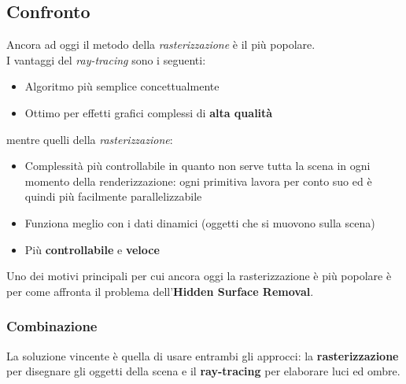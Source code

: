 \subsection{Confronto}
Ancora ad oggi il metodo della \textit{rasterizzazione} è il più popolare.\\
I vantaggi del \textit{ray-tracing} sono i seguenti:
\begin{itemize}
	\item Algoritmo più semplice concettualmente
	\item Ottimo per effetti grafici complessi di \textbf{alta qualità}
\end{itemize}
mentre quelli della \textit{rasterizzazione}:
\begin{itemize}
	\item Complessità più controllabile in quanto non serve tutta la scena in ogni momento della renderizzazione: ogni primitiva lavora per conto suo ed è quindi più facilmente parallelizzabile
	\item Funziona meglio con i dati dinamici (oggetti che si muovono sulla scena)
	\item Più \textbf{controllabile} e \textbf{veloce}
\end{itemize}
Uno dei motivi principali per cui ancora oggi la rasterizzazione è più popolare è per come affronta il problema dell'\textbf{Hidden Surface Removal}.
\subsubsection{Combinazione}
La soluzione vincente è quella di usare entrambi gli approcci: la \textbf{rasterizzazione} per disegnare gli oggetti della scena e il \textbf{ray-tracing} per elaborare luci ed ombre.
